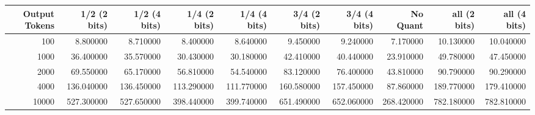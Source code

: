 \begin{tabular}{rrrrrrrrrr}
\toprule
Output Tokens & 1/2 (2 bits) & 1/2 (4 bits) & 1/4 (2 bits) & 1/4 (4 bits) & 3/4 (2 bits) & 3/4 (4 bits) & No Quant & all (2 bits) & all (4 bits) \\
\midrule
100 & 8.800000 & 8.710000 & 8.400000 & 8.640000 & 9.450000 & 9.240000 & 7.170000 & 10.130000 & 10.040000 \\
1000 & 36.400000 & 35.570000 & 30.430000 & 30.180000 & 42.410000 & 40.440000 & 23.910000 & 49.780000 & 47.450000 \\
2000 & 69.550000 & 65.170000 & 56.810000 & 54.540000 & 83.120000 & 76.400000 & 43.810000 & 90.790000 & 90.290000 \\
4000 & 136.040000 & 136.450000 & 113.290000 & 111.770000 & 160.580000 & 157.450000 & 87.860000 & 189.770000 & 179.410000 \\
10000 & 527.300000 & 527.650000 & 398.440000 & 399.740000 & 651.490000 & 652.060000 & 268.420000 & 782.180000 & 782.810000 \\
\bottomrule
\end{tabular}
